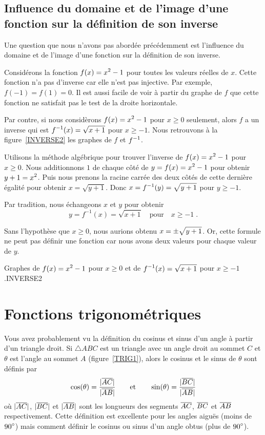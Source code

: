 {\subsection[Influence du domaine et de l'image]{Influence du domaine
  et de l'image d'une fonction sur la définition de son inverse}

Une question que nous n'avons pas abordée précédemment est l'influence du
domaine et de l'image d'une fonction sur la définition de son
inverse.

\begin{egg}
Considérons la fonction $\displaystyle f(x) = x^2 -1$ pour toutes les valeurs
réelles de $x$.  Cette fonction n'a pas d'inverse car elle n'est pas
injective.  Par exemple, $f(-1) = f(1) = 0$.  Il est aussi facile de
voir à partir du graphe de $f$ que cette fonction ne satisfait pas le
test de la droite horizontale.

Par contre, si nous considèrons $\displaystyle f(x) = x^2-1$ pour $x\geq 0$ seulement,
alors $f$ a un inverse qui est $\displaystyle f^{-1}(x) = \sqrt{x+1}$ pour
$x\geq -1$.  Nous retrouvons à la figure~\ref{INVERSE2} les graphes de
$f$ et $\displaystyle f^{-1}$.

Utilisons la méthode algébrique pour trouver l'inverse de
$\displaystyle f(x) = x^2-1$ pour $x\geq 0$.  Nous additionnons $1$ de chaque
côté de $\displaystyle y = f(x) = x^2 -1$ pour obtenir $\displaystyle y + 1 =  x^2$.
Puis nous prenons la racine carrée des deux côtés de cette dernière
égalité pour obtenir $x = \sqrt{y + 1}$.
Donc $\displaystyle x = f^{-1}(y) = \sqrt{y+1}$ pour $y \geq -1$.

Par tradition, nous échangeons $x$ et $y$ pour obtenir
\[
y = f^{-1}(x) = \sqrt{x + 1} \quad \text{pour} \quad x\geq -1 \; .
\]

Sans l'hypothèse que $x\geq 0$, nous aurions obtenu
$\displaystyle x = \pm \sqrt{y + 1}$.  Or, cette formule ne peut pas
définir une fonction car nous avons deux valeurs pour chaque valeur de $y$.
\end{egg}

{Graphes de $\displaystyle f(x) = x^2 -1$ pour $x\geq 0$ et de
$\displaystyle f^{-1}(x) = \sqrt{x+1}$ pour $x\geq -1$.}{INVERSE2}

\section{Fonctions trigonométriques \life \eng}

Vous avez probablement vu la définition du cosinus et sinus d'un angle
à partir d'un triangle droit.  Si $\triangle ABC$ est un triangle avec
un angle droit au sommet $C$ et $\theta$ est l'angle au sommet $A$
(figure~\ref{TRIG1}), alors le cosinus et le sinus de $\theta$
sont définis par
\[
\cos(\theta) = \frac{|\overline{AC}|}{|\overline{AB}|}
\qquad \text {et} \qquad
\sin(\theta) = \frac{|\overline{BC}|}{|\overline{AB}|}
\]
où $|\overline{AC}|$, $|\overline{BC}|$ et $|\overline{AB}|$ sont les longueurs des
segments $\overline{AC}$, $\overline{BC}$ et $\overline{AB}$ respectivement.  Cette
définition est excellente pour les angles aiguës (moins de
$\displaystyle 90^\circ$) mais comment définir le cosinus ou sinus d'un angle obtus
(plus de $\displaystyle 90^\circ$).

}
